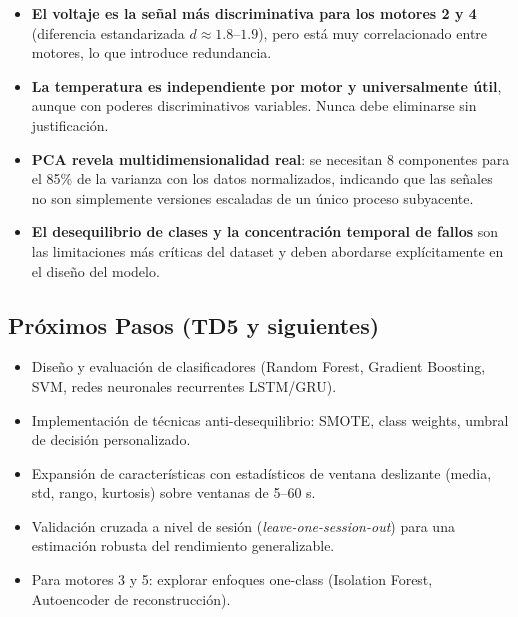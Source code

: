 \documentclass[12pt,a4paper]{article}
\begin{document}
\begin{itemize}[leftmargin=2em]
  \item \textbf{El voltaje es la señal más discriminativa para los motores 2 y 4}
    (diferencia estandarizada $d \approx 1.8$--$1.9$), pero está muy correlacionado
    entre motores, lo que introduce redundancia.

  \item \textbf{La temperatura es independiente por motor y universalmente útil},
    aunque con poderes discriminativos variables. Nunca debe eliminarse sin justificación.

  \item \textbf{PCA revela multidimensionalidad real}: se necesitan 8 componentes para
    el 85\% de la varianza con los datos normalizados, indicando que las señales
    no son simplemente versiones escaladas de un único proceso subyacente.

  \item \textbf{El desequilibrio de clases y la concentración temporal de fallos}
    son las limitaciones más críticas del dataset y deben abordarse explícitamente
    en el diseño del modelo.
\end{itemize}

\subsection{Próximos Pasos (TD5 y siguientes)}

\begin{itemize}[leftmargin=2em]
  \item Diseño y evaluación de clasificadores (Random Forest, Gradient Boosting,
    SVM, redes neuronales recurrentes LSTM/GRU).
  \item Implementación de técnicas anti-desequilibrio: SMOTE, class weights,
    umbral de decisión personalizado.
  \item Expansión de características con estadísticos de ventana deslizante
    (media, std, rango, kurtosis) sobre ventanas de 5--60 s.
  \item Validación cruzada a nivel de sesión (\textit{leave-one-session-out})
    para una estimación robusta del rendimiento generalizable.
  \item Para motores 3 y 5: explorar enfoques one-class (Isolation Forest,
    Autoencoder de reconstrucción).
\end{itemize}
\end{document}
